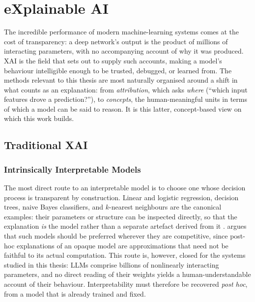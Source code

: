 
\section{eXplainable AI} \label{sec:background:xai}

The incredible performance of modern machine-learning systems comes at the cost
of transparency: a deep network's output is the product of millions of
interacting parameters, with no accompanying account of why it was produced.
\Acf{XAI} is the field that sets out to supply such accounts, making a model's
behaviour intelligible enough to be trusted, debugged, or learned from. The
methods relevant to this thesis are most naturally organised around a shift in
what counts as an explanation: from \textit{attribution}, which asks
\textit{where} (``which input features drove a prediction?''), to
\textit{concepts}, the human-meaningful units in terms of which a model can be
said to reason. It is this latter, concept-based view on which this work builds.

\subsection{Traditional XAI} \label{sec:background:xai:trad-xai}

\subsubsection{Intrinsically Interpretable Models}
\label{sec:background:xai:trad-xai:intrinsic}

The most direct route to an interpretable model is to choose one whose decision
process is transparent by construction. Linear and logistic regression, decision
trees, naive Bayes classifiers, and $k$-nearest neighbours are the canonical
examples: their parameters or structure can be inspected directly, so that the
explanation \textit{is} the model rather than a separate artefact derived from
it \citep{molnarInterpretableMachineLearning2025}.
\citet{rudinStopExplainingBlack2019} argues that such models should be preferred
wherever they are competitive, since post-hoc explanations of an opaque model
are approximations that need not be faithful to its actual computation. This
route is, however, closed for the systems studied in this thesis: \acp{LLM}
comprise billions of nonlinearly interacting parameters, and no direct reading
of their weights yields a human-understandable account of their behaviour.
Interpretability must therefore be recovered \textit{post hoc}, from a model
that is already trained and fixed.

